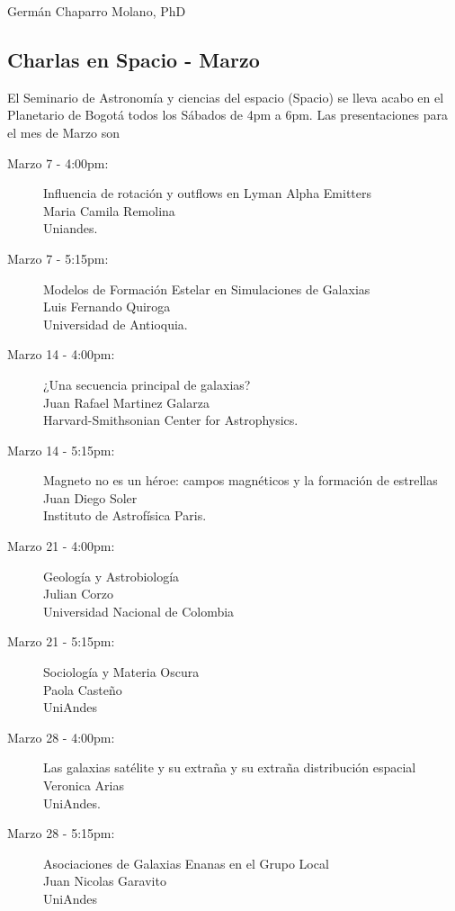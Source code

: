 \documentclass{book}
\begin{document}
\begin{flushright}
Germán Chaparro Molano, PhD
\end{flushright}

\newpage
\subsection{Charlas en Spacio - Marzo}
El Seminario de Astronomía y ciencias del espacio (Spacio) se lleva acabo en el Planetario de Bogotá todos los Sábados de 4pm a 6pm. Las presentaciones para el mes de Marzo son 

\begin{description}
\item[Marzo 7 - 4:00pm:] Influencia de rotación y outflows en Lyman Alpha Emitters\\
Maria Camila Remolina\\
Uniandes.
\item[Marzo 7 - 5:15pm:] Modelos de Formación Estelar en Simulaciones de Galaxias\\
Luis Fernando Quiroga\\
Universidad de Antioquia.
\item[Marzo 14 - 4:00pm:] ¿Una secuencia principal de galaxias?\\ 
Juan Rafael Martinez Galarza\\ 
Harvard-Smithsonian Center for Astrophysics. 
\item[Marzo 14 - 5:15pm:] Magneto no es un héroe: campos magnéticos y la formación de estrellas\\ 
Juan Diego Soler\\
Instituto de Astrofísica Paris.   
\item[Marzo 21 - 4:00pm:] Geología y Astrobiología\\ 
Julian Corzo\\  
Universidad Nacional de Colombia
\item[Marzo 21 - 5:15pm:] Sociología y Materia Oscura\\
Paola Casteño\\ 
UniAndes  
\item[Marzo 28 - 4:00pm:] Las galaxias satélite y su extraña y su extraña distribución espacial\\
Veronica Arias\\
UniAndes.
\item[Marzo 28 - 5:15pm:] Asociaciones de Galaxias Enanas en el Grupo Local\\
Juan Nicolas Garavito\\
UniAndes 
\end{description}
\end{document}
